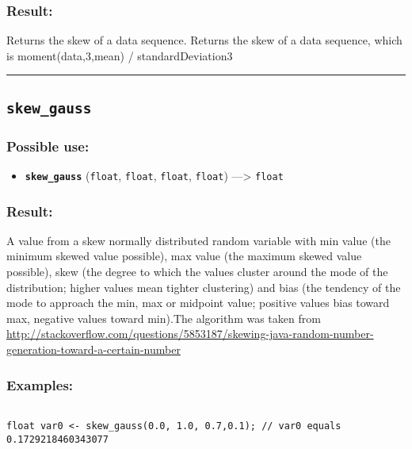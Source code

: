\documentclass[]{book}
\providecommand{\tightlist}{%
  \setlength{\itemsep}{0pt}\setlength{\parskip}{0pt}}
\theoremstyle{definition}
\theoremstyle{definition}
\theoremstyle{definition}
\theoremstyle{remark}
\begin{document}
\subsubsection{Result:}\label{result-464}

Returns the skew of a data sequence. Returns the skew of a data
sequence, which is moment(data,3,mean) / standardDeviation3

\begin{center}\rule{0.5\linewidth}{\linethickness}\end{center}

\subsection{\texorpdfstring{\texttt{skew\_gauss}}{skew\_gauss}}\label{skew_gauss}

\subsubsection{Possible use:}\label{possible-use-481}

\begin{itemize}
\tightlist
\item
  \textbf{\texttt{skew\_gauss}} (\texttt{float}, \texttt{float},
  \texttt{float}, \texttt{float}) ---\textgreater{} \texttt{float}
\end{itemize}

\subsubsection{Result:}\label{result-465}

A value from a skew normally distributed random variable with min value
(the minimum skewed value possible), max value (the maximum skewed value
possible), skew (the degree to which the values cluster around the mode
of the distribution; higher values mean tighter clustering) and bias
(the tendency of the mode to approach the min, max or midpoint value;
positive values bias toward max, negative values toward min).The
algorithm was taken from
\url{http://stackoverflow.com/questions/5853187/skewing-java-random-number-generation-toward-a-certain-number}

\subsubsection{Examples:}\label{examples-336}

\begin{verbatim}
 
float var0 <- skew_gauss(0.0, 1.0, 0.7,0.1); // var0 equals 0.1729218460343077
\end{verbatim}
\end{document}
